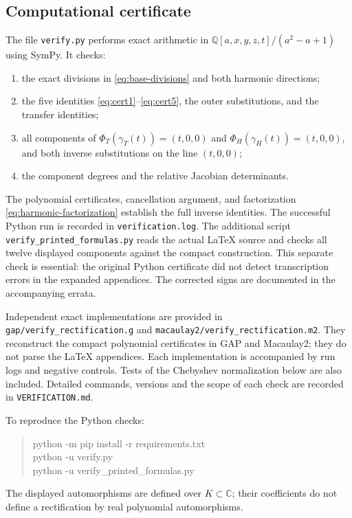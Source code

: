 \documentclass[11pt,a4paper]{article}
\newcommand{\Q}{\mathbb Q}
\newcommand{\C}{\mathbb C}
\begin{document}
\subsection{Computational certificate}

The file \texttt{verify.py} performs exact arithmetic in
$\Q[a,x,y,z,t]/(a^2-a+1)$ using SymPy. It checks:
\begin{enumerate}
\item the exact divisions in \eqref{eq:base-divisions} and both harmonic
      directions;
\item the five identities \eqref{eq:cert1}--\eqref{eq:cert5}, the outer
      substitutions, and the transfer identities;
\item all components of $\Phi_T(\gamma_T(t))=(t,0,0)$ and
      $\Phi_H(\gamma_H(t))=(t,0,0)$, and both inverse substitutions on
      the line $(t,0,0)$;
\item the component degrees and the relative Jacobian determinants.
\end{enumerate}
The polynomial certificates, cancellation argument, and factorization
\eqref{eq:harmonic-factorization} establish the full inverse identities.
The successful Python run is recorded in \texttt{verification.log}.
The additional script \texttt{verify\_printed\_formulas.py} reads the
actual LaTeX source and checks all twelve displayed components against
the compact construction. This separate check is essential: the original
Python certificate did not detect transcription errors in the expanded
appendices. The corrected signs are documented in the accompanying errata.

Independent exact implementations are provided in
\texttt{gap/verify\_rectification.g} and
\texttt{macaulay2/verify\_rectification.m2}. They reconstruct the
compact polynomial certificates in GAP and Macaulay2; they do not parse
the LaTeX appendices. Each implementation is accompanied by run logs
and negative controls. Tests of the Chebyshev normalization below are
also included. Detailed commands, versions and the scope of each check
are recorded in \texttt{VERIFICATION.md}.

To reproduce the Python checks:
\begin{quote}\ttfamily\small
python -m pip install -r requirements.txt\\
python -u verify.py\\
python -u verify\_printed\_formulas.py
\end{quote}
The displayed automorphisms are defined over $K\subset\C$; their
coefficients do not define a rectification by real polynomial automorphisms.

\clearpage


\clearpage

\end{document}
